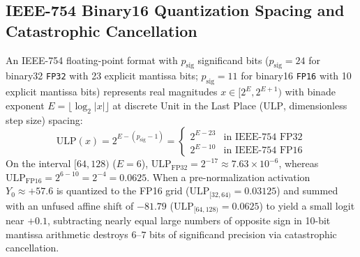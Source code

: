 \documentclass[10pt,twocolumn]{article}
\begin{document}
\subsection{IEEE-754 Binary16 Quantization Spacing and Catastrophic Cancellation}
An IEEE-754 floating-point format with $p_{\text{sig}}$ significand bits ($p_{\text{sig}}=24$ for binary32 \texttt{FP32} with 23 explicit mantissa bits; $p_{\text{sig}}=11$ for binary16 \texttt{FP16} with 10 explicit mantissa bits) represents real magnitudes $x \in [2^E, 2^{E+1})$ with binade exponent $E = \lfloor \log_2 \lvert x \rvert \rfloor$ at discrete Unit in the Last Place ($\text{ULP}$, dimensionless step size) spacing:
\begin{equation}
    \text{ULP}(x) = 2^{E - (p_{\text{sig}} - 1)} = \begin{cases}
    2^{E - 23} & \text{in IEEE-754 FP32} \\
    2^{E - 10} & \text{in IEEE-754 FP16}
    \end{cases}
\end{equation}
On the interval $[64, 128)$ ($E = 6$), $\text{ULP}_{\text{FP32}} = 2^{-17} \approx 7.63 \times 10^{-6}$, whereas $\text{ULP}_{\text{FP16}} = 2^{6 - 10} = 2^{-4} = \mathbf{0.0625}$. When a pre-normalization activation $Y_0 \approx +57.6$ is quantized to the FP16 grid ($\text{ULP}_{[32,64)} = 0.03125$) and summed with an unfused affine shift of $-81.79$ ($\text{ULP}_{[64,128)} = 0.0625$) to yield a small logit near $+0.1$, subtracting nearly equal large numbers of opposite sign in 10-bit mantissa arithmetic destroys $6\text{--}7$ bits of significand precision via catastrophic cancellation.
\end{document}
